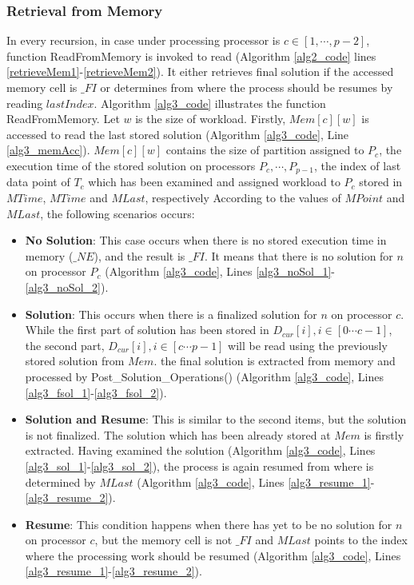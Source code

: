\documentclass[12pt]{article}
\begin{document}
\subsubsection{Retrieval from Memory}
In every recursion, in case under processing processor is $c \in [1,\cdots,p - 2]$, function ReadFromMemory is invoked to read (Algorithm \ref{alg2_code} lines \ref{retrieveMem1}-\ref{retrieveMem2}). It either retrieves final solution if the accessed memory cell is $\_FI$ or determines from where the process should be resumes by reading $lastIndex$. Algorithm \ref{alg3_code} illustrates the function ReadFromMemory. Let $w$ is the size of workload. Firstly, $Mem[c][w]$ is accessed to read the last stored solution (Algorithm \ref{alg3_code}, Line \ref{alg3_memAcc}). $Mem[c][w]$ contains the size of partition assigned to $P_c$, the execution time of the stored solution on processors $P_c,\cdots,P_{p-1}$, the index of last data point of $T_c$ which has been examined and assigned workload to $P_c$ stored in $MTime$, $MTime$ and $MLast$, respectively According to the values of $MPoint$ and $MLast$, the following scenarios occurs:

\begin{itemize}
\item \textbf{No Solution}: This case occurs when there is no stored execution time in memory ($\_NE$), and the result is $\_FI$. It means that there is no solution for $n$ on processor $P_c$ (Algorithm \ref{alg3_code}, Lines \ref{alg3_noSol_1}-\ref{alg3_noSol_2}).

\item \textbf{Solution}:  This occurs when there is a finalized solution for $n$ on processor $c$. While the first part of solution has been stored in $D_{cur}[i], i \in [0 \cdots c - 1]$, the second part, $D_{cur}[i], i \in [c \cdots p - 1]$ will be read using the previously stored solution from $Mem$. the final solution is extracted from memory and processed by Post\_Solution\_Operations() (Algorithm \ref{alg3_code}, Lines \ref{alg3_fsol_1}-\ref{alg3_fsol_2}).

\item \textbf{Solution and Resume}: This is similar to the second items, but the solution is not finalized. The solution which has been already stored at $Mem$ is firstly extracted. Having examined the solution (Algorithm \ref{alg3_code}, Lines \ref{alg3_sol_1}-\ref{alg3_sol_2}), the process is again resumed from where is determined by $MLast$ (Algorithm \ref{alg3_code}, Lines \ref{alg3_resume_1}-\ref{alg3_resume_2}).

\item \textbf{Resume}: This condition happens when there has yet to be no solution for $n$ on processor $c$, but the memory cell is not $\_FI$ and $MLast$ points to the index where the processing work should be resumed (Algorithm \ref{alg3_code}, Lines \ref{alg3_resume_1}-\ref{alg3_resume_2}).
\end{itemize}
\end{document}
